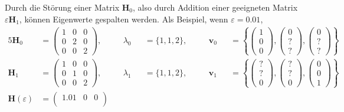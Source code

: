 Durch die Störung einer Matrix $\bm H_0$, also durch Addition einer geeigneten Matrix $\varepsilon \bm H_1$, können Eigenwerte gespalten werden.
Als Beispiel, wenn $\varepsilon = 0.01$,
\begin{alignat}{5}
    \bm H_0 &=
    \begin{pmatrix}
        1 & 0 & 0\\
        0 & 2 & 0\\
        0 & 0 & 2
    \end{pmatrix},
    \quad
    && \lambda_0 &&= \{1, 1, 2\},
    \quad
    && \bm v_0 &&= \left\{
    \begin{pmatrix}
        1\\
        0\\
        0
    \end{pmatrix},
    \begin{pmatrix}
        0\\
        ?\\
        ?
    \end{pmatrix},
    \begin{pmatrix}
        0\\
        ?\\
        ?
    \end{pmatrix}
    \right\}
    \\
    \bm H_1 &=
    \begin{pmatrix}
        1 & 0 & 0\\
        0 & 1 & 0\\
        0 & 0 & 2
    \end{pmatrix},
    \quad
    && \lambda_1 &&= \{1, 1, 2\},
    \quad
    && \bm v_1 &&= \left\{
    \begin{pmatrix}
        ?\\
        ?\\
        0
    \end{pmatrix},
    \begin{pmatrix}
        ?\\
        ?\\
        0
    \end{pmatrix},
    \begin{pmatrix}
        0\\
        0\\
        1
    \end{pmatrix}
    \right\}
    \\
    \bm H(\varepsilon) &=
    \begin{pmatrix}
        1.01 & 0 & 0\\

\end{pmatrix}
\end{alignat}
